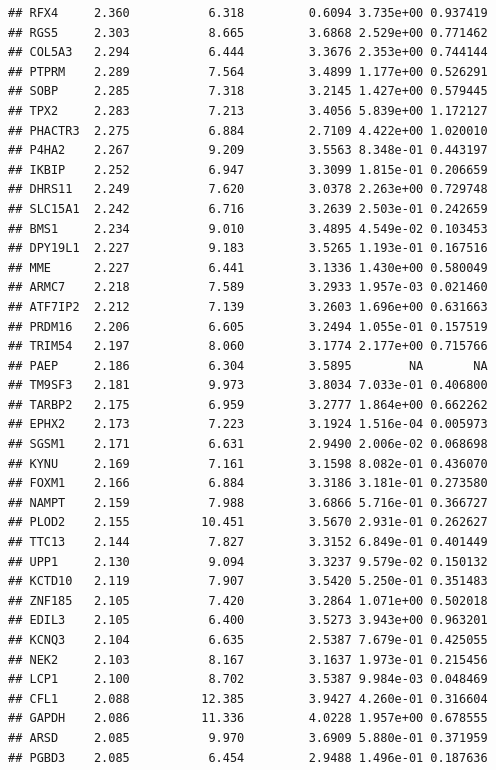 \documentclass{article}\usepackage[]{graphicx}\usepackage[]{color}
\makeatletter
\newenvironment{kframe}{%
 \def\at@end@of@kframe{}%
 \ifinner\ifhmode%
  \def\at@end@of@kframe{\end{minipage}}%
  \begin{minipage}{\columnwidth}%
 \fi\fi%
 \def\FrameCommand##1{\hskip\@totalleftmargin \hskip-\fboxsep
 \colorbox{shadecolor}{##1}\hskip-\fboxsep
     \hskip-\linewidth \hskip-\@totalleftmargin \hskip\columnwidth}%
 \MakeFramed {\advance\hsize-\width
   \@totalleftmargin\z@ \linewidth\hsize
   \@setminipage}}%
 {\par\unskip\endMakeFramed%
 \at@end@of@kframe}
\newenvironment{knitrout}{}{} %
\makeatother
\begin{document}
\begin{knitrout}
\begin{kframe}
\begin{verbatim}
## RFX4     2.360           6.318         0.6094 3.735e+00 0.937419
## RGS5     2.303           8.665         3.6868 2.529e+00 0.771462
## COL5A3   2.294           6.444         3.3676 2.353e+00 0.744144
## PTPRM    2.289           7.564         3.4899 1.177e+00 0.526291
## SOBP     2.285           7.318         3.2145 1.427e+00 0.579445
## TPX2     2.283           7.213         3.4056 5.839e+00 1.172127
## PHACTR3  2.275           6.884         2.7109 4.422e+00 1.020010
## P4HA2    2.267           9.209         3.5563 8.348e-01 0.443197
## IKBIP    2.252           6.947         3.3099 1.815e-01 0.206659
## DHRS11   2.249           7.620         3.0378 2.263e+00 0.729748
## SLC15A1  2.242           6.716         3.2639 2.503e-01 0.242659
## BMS1     2.234           9.010         3.4895 4.549e-02 0.103453
## DPY19L1  2.227           9.183         3.5265 1.193e-01 0.167516
## MME      2.227           6.441         3.1336 1.430e+00 0.580049
## ARMC7    2.218           7.589         3.2933 1.957e-03 0.021460
## ATF7IP2  2.212           7.139         3.2603 1.696e+00 0.631663
## PRDM16   2.206           6.605         3.2494 1.055e-01 0.157519
## TRIM54   2.197           8.060         3.1774 2.177e+00 0.715766
## PAEP     2.186           6.304         3.5895        NA       NA
## TM9SF3   2.181           9.973         3.8034 7.033e-01 0.406800
## TARBP2   2.175           6.959         3.2777 1.864e+00 0.662262
## EPHX2    2.173           7.223         3.1924 1.516e-04 0.005973
## SGSM1    2.171           6.631         2.9490 2.006e-02 0.068698
## KYNU     2.169           7.161         3.1598 8.082e-01 0.436070
## FOXM1    2.166           6.884         3.3186 3.181e-01 0.273580
## NAMPT    2.159           7.988         3.6866 5.716e-01 0.366727
## PLOD2    2.155          10.451         3.5670 2.931e-01 0.262627
## TTC13    2.144           7.827         3.3152 6.849e-01 0.401449
## UPP1     2.130           9.094         3.3237 9.579e-02 0.150132
## KCTD10   2.119           7.907         3.5420 5.250e-01 0.351483
## ZNF185   2.105           7.420         3.2864 1.071e+00 0.502018
## EDIL3    2.105           6.400         3.5273 3.943e+00 0.963201
## KCNQ3    2.104           6.635         2.5387 7.679e-01 0.425055
## NEK2     2.103           8.167         3.1637 1.973e-01 0.215456
## LCP1     2.100           8.702         3.5387 9.984e-03 0.048469
## CFL1     2.088          12.385         3.9427 4.260e-01 0.316604
## GAPDH    2.086          11.336         4.0228 1.957e+00 0.678555
## ARSD     2.085           9.970         3.6909 5.880e-01 0.371959
## PGBD3    2.085           6.454         2.9488 1.496e-01 0.187636

\end{verbatim}
\end{kframe}
\end{knitrout}
\end{document}
